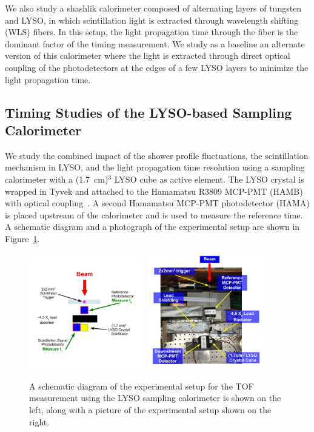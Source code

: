 We also study a shashlik calorimeter composed of alternating layers of
tungsten and LYSO, in which scintillation light is extracted through wavelength
shifting (WLS) fibers. In this setup, the light propagation time through the fiber is the
dominant factor of the timing measurement. We study as a baseline an alternate version of this
calorimeter where the light is extracted through direct optical coupling of  the 
photodetectors at the edges of a few LYSO layers to minimize  the light propagation time.


\subsection{Timing Studies of the LYSO-based Sampling Calorimeter}

We study the combined impact of the shower profile fluctuations, the
scintillation mechanism in LYSO, and the light propagation time resolution
using a sampling calorimeter with a (1.7~cm)$^{3}$ LYSO cube as active
element. The LYSO crystal is wrapped in Tyvek and attached to the Hamamatsu
R3809 MCP-PMT (HAMB) with optical coupling~\cite{grease}.   A second Hamamatsu 
MCP-PMT  photodetector (HAMA)  is placed upstream of the calorimeter and is used 
to measure the reference time. A schematic diagram and a photograph of the experimental setup
are shown in Figure~\ref{fig:LYSOSamplingCaloSetup}. 

\begin{figure}[h] \centering
\includegraphics[width=0.45\textwidth]{figs/LYSOSamplingCaloSetupSchematic} 
\includegraphics[width=0.45\textwidth]{figs/LYSOSamplingCaloSetupPhoto} 
\caption{ \small A schematic diagram of the experimental setup for the
TOF measurement using the LYSO sampling calorimeter is shown
on the left, along with a picture of the experimental setup shown on the right. } 
\label{fig:LYSOSamplingCaloSetup}
\end{figure}

